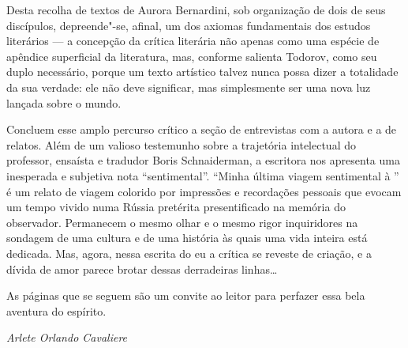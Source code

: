 Desta recolha de textos de Aurora Bernardini, sob organização de dois de
seus discípulos, depreende"-se, afinal, um dos axiomas fundamentais dos
estudos literários --- a concepção da crítica literária não
apenas como uma espécie de apêndice superficial da literatura, mas,
conforme salienta Todorov, como seu duplo necessário, porque um texto
artístico talvez nunca possa dizer a totalidade da sua verdade: ele não
deve significar, mas simplesmente ser uma nova luz lançada sobre o
mundo.

Concluem esse amplo percurso crítico a seção de entrevistas com a
 autora e a de relatos. Além de um valioso testemunho sobre a 
trajetória intelectual do professor, ensaísta e tradudor Boris 
Schnaiderman, a escritora nos apresenta uma inesperada e subjetiva nota
``sentimental''. ``Minha última viagem sentimental à \scalebox{0.8}{URSS}'' é um relato
de viagem colorido por impressões e recordações pessoais que evocam um
tempo vivido numa Rússia pretérita presentificado na
memória do observador. Permanecem o mesmo olhar e o mesmo rigor
inquiridores na sondagem de uma cultura e de uma história às quais uma
vida inteira está dedicada. Mas, agora, nessa escrita do eu a crítica se
reveste de criação, e a dívida de amor parece brotar dessas derradeiras
linhas\ldots{}

As páginas que se seguem são um convite ao leitor para perfazer essa
bela aventura do espírito.

\begin{flushright}
\emph{Arlete Orlando Cavaliere}
\end{flushright}


